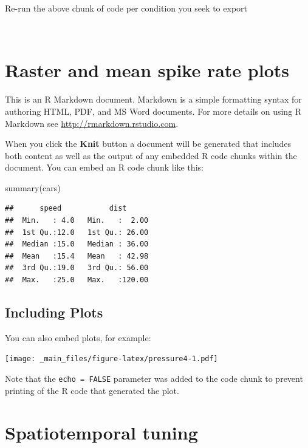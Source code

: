\documentclass[
]{book}
\newenvironment{Shaded}{\begin{snugshade}}{\end{snugshade}}
\newcommand{\FunctionTok}[1]{\textcolor[rgb]{0.00,0.00,0.00}{#1}}
\newcommand{\NormalTok}[1]{#1}
\begin{document}
Re-run the above chunk of code per condition you seek to export

🐢

\hypertarget{raster-and-mean-spike-rate-plots}{%
\chapter{Raster and mean spike rate plots}\label{raster-and-mean-spike-rate-plots}}

This is an R Markdown document. Markdown is a simple formatting syntax for authoring HTML, PDF, and MS Word documents. For more details on using R Markdown see \url{http://rmarkdown.rstudio.com}.

When you click the \textbf{Knit} button a document will be generated that includes both content as well as the output of any embedded R code chunks within the document. You can embed an R code chunk like this:

\begin{Shaded}
\begin{Highlighting}[]
\FunctionTok{summary}\NormalTok{(cars)}
\end{Highlighting}
\end{Shaded}

\begin{verbatim}
##      speed           dist       
##  Min.   : 4.0   Min.   :  2.00  
##  1st Qu.:12.0   1st Qu.: 26.00  
##  Median :15.0   Median : 36.00  
##  Mean   :15.4   Mean   : 42.98  
##  3rd Qu.:19.0   3rd Qu.: 56.00  
##  Max.   :25.0   Max.   :120.00
\end{verbatim}

\hypertarget{including-plots-1}{%
\section{Including Plots}\label{including-plots-1}}

You can also embed plots, for example:

\texttt{[image: \_main\_files/figure-latex/pressure4-1.pdf]}

Note that the \texttt{echo\ =\ FALSE} parameter was added to the code chunk to prevent printing of the R code that generated the plot.

\hypertarget{spatiotemporal-tuning}{%
\chapter{Spatiotemporal tuning}\label{spatiotemporal-tuning}}
\end{document}
